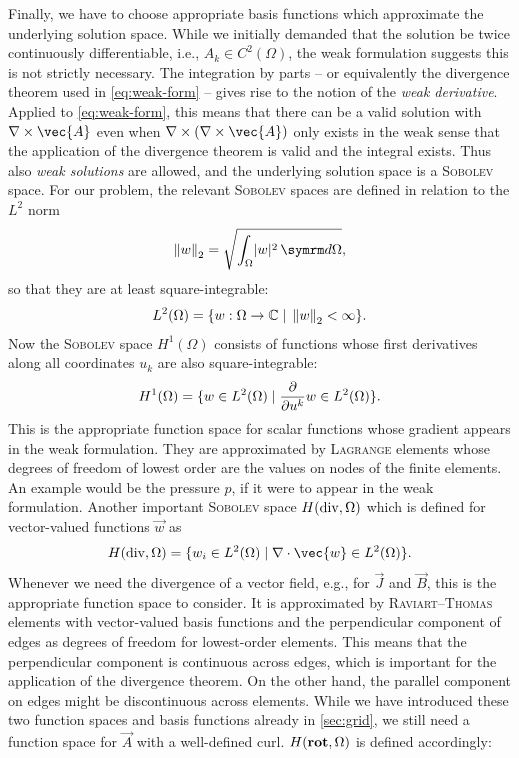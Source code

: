 Finally, we have to choose appropriate basis functions which approximate the underlying solution space. While we initially demanded that the solution be twice continuously differentiable, i.e., $A_{k} \in C^{2} (\Omega)$, the weak formulation suggests this is not strictly necessary. The integration by parts -- or equivalently the divergence theorem used in \cref{eq:weak-form} -- gives rise to the notion of the \emph{weak derivative}. Applied to \cref{eq:weak-form}, this means that there can be a valid solution with $\curl \vec{A}$ even when $\curl (\curl \vec{A})$ only exists in the weak sense that the application of the divergence theorem is valid and the integral exists. Thus also \emph{weak solutions} are allowed, and the underlying solution space is a \textsc{Sobolev} space. For our problem, the relevant \textsc{Sobolev} spaces are defined in relation to the $L^{2}$ norm
\begin{gather}
  \norm{w}_{2} = \sqrt{\int_{\Omega} \lvert w \rvert^{2} \, \diff \Omega}, \label{eq:L2-norm}
\end{gather}
so that they are at least square-integrable:
\begin{gather}
  L^{2} (\Omega) = \{ w : \Omega \to \mathbb{C} \; \vert \; \norm{w}_{2} < \infty \}.
\end{gather}
Now the \textsc{Sobolev} space $H^{1} (\Omega)$ consists of functions whose first derivatives along all coordinates $u_{k}$ are also square-integrable:
\begin{gather}
  H^{1} (\Omega) = \{ w \in L^{2} (\Omega) \; \vert \; \frac{\partial }{\partial u^{k}} w \in L^{2} (\Omega) \}.
\end{gather}
This is the appropriate function space for scalar functions whose gradient appears in the weak formulation. They are approximated by \textsc{Lagrange} elements whose degrees of freedom of lowest order are the values on nodes of the finite elements. An example would be the pressure $p$, if it were to appear in the weak formulation. Another important \textsc{Sobolev} space $H (\operatorname{div}, \Omega)$ which is defined for vector-valued functions $\vec{w}$ as
\begin{gather}
  H (\Divg, \Omega) = \{ w_{i} \in L^{2} (\Omega) \; \vert \; \divg \vec{w} \in L^2 (\Omega) \}.
\end{gather}
Whenever we need the divergence of a vector field, e.g., for $\vec{J}$ and $\vec{B}$, this is the appropriate function space to consider. It is approximated by \textsc{Raviart}--\textsc{Thomas} elements with vector-valued basis functions and the perpendicular component of edges as degrees of freedom for lowest-order elements. This means that the perpendicular component is continuous across edges, which is important for the application of the divergence theorem. On the other hand, the parallel component on edges might be discontinuous across elements. While we have introduced these two function spaces and basis functions already in \cref{sec:grid}, we still need a function space for $\vec{A}$ with a well-defined curl. $H (\operatorname{\mathbf{rot}}, \Omega)$ is defined accordingly:
